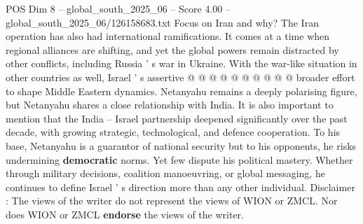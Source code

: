 \begin{textsample}{POS Dim 8 – global\_south\_2025\_06 – Score 4.00 – global\_south\_2025\_06/126158683.txt}
Focus on Iran and why?
The Iran operation has also had international ramifications.
It comes at a time when regional alliances are shifting, and yet the global powers remain distracted by other conflicts, including Russia ' s war in Ukraine.
With the war-like situation in other countries as well, Israel ' s assertive @ @ @ @ @ @ @ @ @ @ broader effort to shape Middle Eastern dynamics.
Netanyahu remains a deeply polarising figure, but Netanyahu shares a close relationship with India.
It is also important to mention that the India -- Israel partnership deepened significantly over the past decade, with growing strategic, technological, and defence cooperation.
To his base, Netanyahu is a guarantor of national security but to his opponents, he risks undermining \textbf{democratic} norms.
Yet few dispute his political mastery.
Whether through military decisions, coalition manoeuvring, or global messaging, he continues to define Israel ' s direction more than any other individual.
Disclaimer : The views of the writer do not represent the views of WION or ZMCL.
Nor does WION or ZMCL \textbf{endorse} the views of the writer.

\end{textsample}
